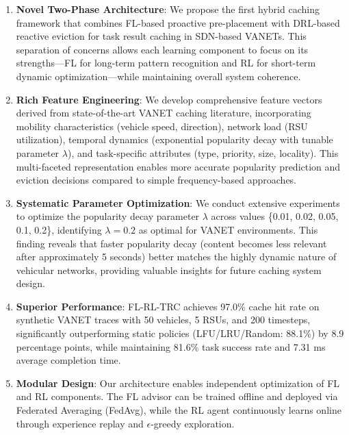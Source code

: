 \begin{enumerate}
    \item \textbf{Novel Two-Phase Architecture}: We propose the first hybrid caching framework that combines FL-based proactive pre-placement with DRL-based reactive eviction for task result caching in SDN-based VANETs. This separation of concerns allows each learning component to focus on its strengths—FL for long-term pattern recognition and RL for short-term dynamic optimization—while maintaining overall system coherence.
    
    \item \textbf{Rich Feature Engineering}: We develop comprehensive feature vectors derived from state-of-the-art VANET caching literature, incorporating mobility characteristics (vehicle speed, direction), network load (RSU utilization), temporal dynamics (exponential popularity decay with tunable parameter $\lambda$), and task-specific attributes (type, priority, size, locality). This multi-faceted representation enables more accurate popularity prediction and eviction decisions compared to simple frequency-based approaches.
    
    \item \textbf{Systematic Parameter Optimization}: We conduct extensive experiments to optimize the popularity decay parameter $\lambda$ across values \{0.01, 0.02, 0.05, 0.1, 0.2\}, identifying $\lambda = 0.2$ as optimal for VANET environments. This finding reveals that faster popularity decay (content becomes less relevant after approximately 5 seconds) better matches the highly dynamic nature of vehicular networks, providing valuable insights for future caching system design.
    
    \item \textbf{Superior Performance}: FL-RL-TRC achieves 97.0\% cache hit rate on synthetic VANET traces with 50 vehicles, 5 RSUs, and 200 timesteps, significantly outperforming static policies (LFU/LRU/Random: 88.1\%) by 8.9 percentage points, while maintaining 81.6\% task success rate and 7.31 ms average completion time.
    
    \item \textbf{Modular Design}: Our architecture enables independent optimization of FL and RL components. The FL advisor can be trained offline and deployed via Federated Averaging (FedAvg), while the RL agent continuously learns online through experience replay and $\epsilon$-greedy exploration.
\end{enumerate}

